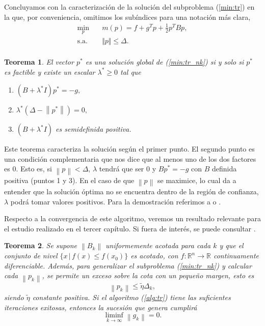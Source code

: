 \documentclass[11pt,a4paper]{book}
\newtheorem{theorem}{Teorema}[chapter]
\theoremstyle{definition}
\theoremstyle{remark}
\newcommand{\norm}[1]{\left\lVert#1\right\rVert}
\begin{document}
Concluyamos con la caracterización de la solución del subproblema (\ref{min:tr}) en la que,
por conveniencia, omitimos los subíndices para una notación más clara,
\begin{equation}
\label{min:tr_nk}
\begin{aligned}
	\min_{p} \quad & m(p) = f + g^Tp + \frac{1}{2}p^TBp, \\
	\text{s.a.} \quad & \Vert p \Vert \leq \Delta. \\
\end{aligned}
\end{equation}

\begin{theorem} \label{th:trustregion}
	El vector $p^*$ es una solución global de (\ref{min:tr_nk}) si y solo si $p^*$ es factible y existe un escalar $\lambda^* \geq 0$ tal que
\begin{enumerate}
	\item $(B+\lambda^* I)p^*=-g,$
	\item $\lambda^* (\Delta - \norm{p^*}) = 0,$
	\item $(B+\lambda^* I)$ es semidefinida positiva.
\end{enumerate}
\end{theorem}

Este teorema caracteriza la solución según el primer punto. El segundo punto es una condición complementaria que nos dice que al menos uno de los dos factores es 0.
Esto es, si $\norm{p}<\Delta$, $\lambda$ tendrá que ser 0 y $Bp^*=-g$ con $B$ definida positiva (puntos 1 y 3).
En el caso de que $\norm{p}$ se maximice, lo cual da a entender que la solución óptima no se encuentra dentro de la región de confianza, $\lambda$ podrá tomar valores positivos.
Para la demostración referimos a \cite[Sección 4.3]{Nocedal2006-kh} o \cite[Teorema 6.1]{Sun2006-au}.

Respecto a la convergencia de este algoritmo, veremos un resultado relevante para el estudio realizado en el
tercer capítulo.
Si fuera de interés, se puede consultar \cite[Sección 6.1.2]{Sun2006-au}.

\begin{theorem} \label{th:conv-tr}
Se supone $\norm{B_k}$ uniformemente acotada para cada $k$
y que el conjunto de nivel $\{x\,|\,f(x)\leq f(x_0)\}$ es acotado, con $f: \mathbb{R}^n \to \mathbb{R}$
continuamente
diferenciable. Además, para generalizar el subproblema (\ref{min:tr_nk}) y calcular cada $\norm{p_k}$,
se permite
un exceso sobre la cota con un pequeño margen, esto es
\begin{equation}
	\norm{p_k} \leq \tilde{\eta} \Delta_k,
\end{equation}
siendo $\tilde{\eta}$ constante positiva.
Si el algoritmo (\ref{alg:tr}) tiene las suficientes iteraciones exitosas,
entonces la sucesión que genera cumplirá
\begin{equation}
	\liminf_{k\to \infty} \norm{g_k} = 0.
\end{equation}
\end{theorem}
\end{document}
